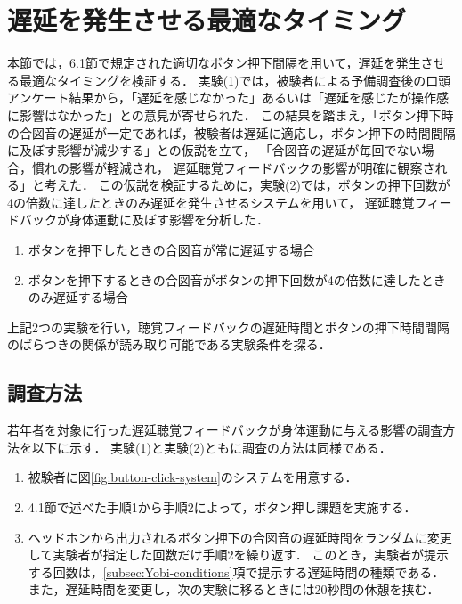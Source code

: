 \section{遅延を発生させる最適なタイミング}
本節では，6.1節で規定された適切なボタン押下間隔を用いて，遅延を発生させる最適なタイミングを検証する．
実験(1)では，被験者による予備調査後の口頭アンケート結果から，「遅延を感じなかった」あるいは「遅延を感じたが操作感に影響はなかった」との意見が寄せられた．
この結果を踏まえ，「ボタン押下時の合図音の遅延が一定であれば，被験者は遅延に適応し，ボタン押下の時間間隔に及ぼす影響が減少する」との仮説を立て，
「合図音の遅延が毎回でない場合，慣れの影響が軽減され，
遅延聴覚フィードバックの影響が明確に観察される」と考えた．
この仮説を検証するために，実験(2)では，ボタンの押下回数が4の倍数に達したときのみ遅延を発生させるシステムを用いて，
遅延聴覚フィードバックが身体運動に及ぼす影響を分析した．
\newpage
\begin{enumerate}[leftmargin=*, label=実験(\arabic*)]
    \item ボタンを押下したときの合図音が常に遅延する場合
    \item ボタンを押下するときの合図音がボタンの押下回数が4の倍数に達したときのみ遅延する場合
\end{enumerate}
上記2つの実験を行い，聴覚フィードバックの遅延時間とボタンの押下時間間隔のばらつきの関係が読み取り可能である実験条件を探る．
\subsection{調査方法}
若年者を対象に行った遅延聴覚フィードバックが身体運動に与える影響の調査方法を以下に示す．
実験(1)と実験(2)ともに調査の方法は同様である．
\begin{enumerate}[leftmargin=*]
  \item 被験者に図\ref{fig:button-click-system}のシステムを用意する．
  \item 4.1節で述べた手順1から手順2によって，ボタン押し課題を実施する．
  \item ヘッドホンから出力されるボタン押下の合図音の遅延時間をランダムに変更して実験者が指定した回数だけ手順2を繰り返す．
  このとき，実験者が提示する回数は，\ref{subsec:Yobi-conditions}項で提示する遅延時間の種類である．
  また，遅延時間を変更し，次の実験に移るときには20秒間の休憩を挟む．
\end{enumerate}
